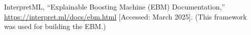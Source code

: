 \documentclass{article}
\begin{document}

\begin{thebibliography}{1}

InterpretML, ``Explainable Boosting Machine (EBM) Documentation,'' \url{https://interpret.ml/docs/ebm.html} [Accessed: March 2025]. (This framework was used for building the EBM.)

\end{thebibliography}
\end{document}
